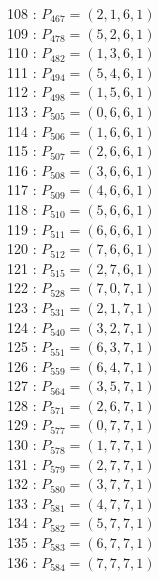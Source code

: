 \documentclass{article}
\begin{document}
{\begin{multicols}{3}
108 : $P_{467}=( 2, 1, 6, 1 )$\\
109 : $P_{478}=( 5, 2, 6, 1 )$\\
110 : $P_{482}=( 1, 3, 6, 1 )$\\
111 : $P_{494}=( 5, 4, 6, 1 )$\\
112 : $P_{498}=( 1, 5, 6, 1 )$\\
113 : $P_{505}=( 0, 6, 6, 1 )$\\
114 : $P_{506}=( 1, 6, 6, 1 )$\\
115 : $P_{507}=( 2, 6, 6, 1 )$\\
116 : $P_{508}=( 3, 6, 6, 1 )$\\
117 : $P_{509}=( 4, 6, 6, 1 )$\\
118 : $P_{510}=( 5, 6, 6, 1 )$\\
119 : $P_{511}=( 6, 6, 6, 1 )$\\
120 : $P_{512}=( 7, 6, 6, 1 )$\\
121 : $P_{515}=( 2, 7, 6, 1 )$\\
122 : $P_{528}=( 7, 0, 7, 1 )$\\
123 : $P_{531}=( 2, 1, 7, 1 )$\\
124 : $P_{540}=( 3, 2, 7, 1 )$\\
125 : $P_{551}=( 6, 3, 7, 1 )$\\
126 : $P_{559}=( 6, 4, 7, 1 )$\\
127 : $P_{564}=( 3, 5, 7, 1 )$\\
128 : $P_{571}=( 2, 6, 7, 1 )$\\
129 : $P_{577}=( 0, 7, 7, 1 )$\\
130 : $P_{578}=( 1, 7, 7, 1 )$\\
131 : $P_{579}=( 2, 7, 7, 1 )$\\
132 : $P_{580}=( 3, 7, 7, 1 )$\\
133 : $P_{581}=( 4, 7, 7, 1 )$\\
134 : $P_{582}=( 5, 7, 7, 1 )$\\
135 : $P_{583}=( 6, 7, 7, 1 )$\\
136 : $P_{584}=( 7, 7, 7, 1 )$\\
\end{multicols}


%


%


}%
\end{document}
